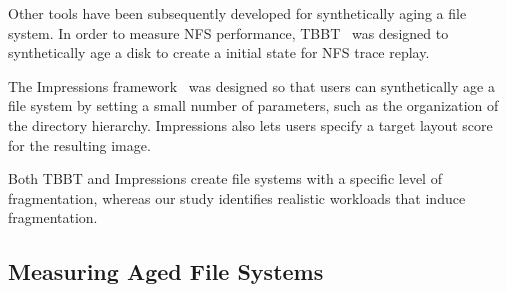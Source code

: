 

Other tools have been subsequently developed for
synthetically aging a file system.
In order to measure NFS performance,
TBBT~\cite{ZhuChCh05} was designed 
to synthetically age a disk 
to create a initial state for NFS trace replay.

The Impressions framework~\cite{AgrawalArAr09} was designed so that
users can synthetically age a 
file system by setting a small number of parameters,
such as the organization of the directory hierarchy.
Impressions also lets users specify a target layout score for the resulting image.

Both TBBT and Impressions
create file systems with a specific level of fragmentation,
whereas our study identifies realistic
workloads that induce fragmentation. 

\subsection{Measuring Aged File Systems}


